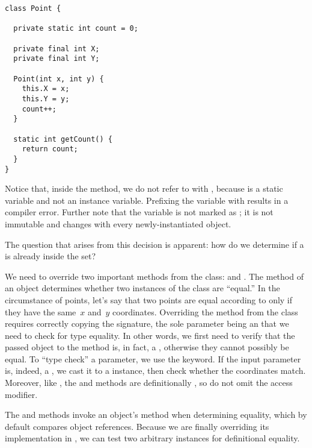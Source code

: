 \begin{lstlisting}[language=MyJava]
class Point {

  private static int count = 0;

  private final int X;
  private final int Y;

  Point(int x, int y) { 
    this.X = x; 
    this.Y = y; 
    count++; 
  }

  static int getCount() { 
    return count; 
  }
}
\end{lstlisting}

Notice that, inside the  method, we do not refer to  with , because  is a static variable and not an instance variable. 
Prefixing the  variable with  results in a compiler error. 
Further note that the variable is not marked as ; it is not immutable and changes with every newly-instantiated  object.

The question that arises from this decision is apparent: how do we determine if a  is already inside the set? 

We need to override two important methods from the  class:  and . 
The  method of an object determines whether two instances of the class are ``equal.'' 
In the circumstance of points, let's say that two points are equal according to  only if they have the same~$x$ and~$y$ coordinates. 
Overriding the  method from the  class requires correctly copying the signature, the sole parameter being an  that we need to check for type equality. 
In other words, we first need to verify that the passed object to the  method is, in fact, a , otherwise they cannot possibly be equal. 
To ``type check'' a parameter, we use the  keyword. 
If the input parameter is, indeed, a , we cast it to a  instance, then check whether the coordinates match. 
Moreover, like , the  and  methods are definitionally , so do not omit the access modifier.

The  and  methods invoke an object's  method when determining equality, which by default compares object references. 
Because we are finally overriding its implementation in , we can test two arbitrary  instances for definitional equality.

